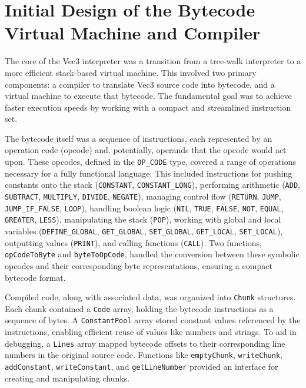 \section{Initial Design of the Bytecode Virtual Machine and Compiler}

The core of the Vec3 interpreter was a transition from a tree-walk interpreter to a more efficient stack-based virtual machine. This involved two primary components: a compiler to translate Vec3 source code into bytecode, and a virtual machine to execute that bytecode. The fundamental goal was to achieve faster execution speeds by working with a compact and streamlined instruction set.

The bytecode itself was a sequence of instructions, each represented by an operation code (opcode) and, potentially, operands that the opcode would act upon. These opcodes, defined in the \texttt{OP\_CODE} type, covered a range of operations necessary for a fully functional language. This included instructions for pushing constants onto the stack (\texttt{CONSTANT}, \texttt{CONSTANT\_LONG}), performing arithmetic (\texttt{ADD}, \texttt{SUBTRACT}, \texttt{MULTIPLY}, \texttt{DIVIDE}, \texttt{NEGATE}), managing control flow (\texttt{RETURN}, \texttt{JUMP}, \texttt{JUMP\_IF\_FALSE}, \texttt{LOOP}), handling boolean logic (\texttt{NIL}, \texttt{TRUE}, \texttt{FALSE}, \texttt{NOT}, \texttt{EQUAL}, \texttt{GREATER}, \texttt{LESS}), manipulating the stack (\texttt{POP}), working with global and local variables (\texttt{DEFINE\_GLOBAL}, \texttt{GET\_GLOBAL}, \texttt{SET\_GLOBAL}, \texttt{GET\_LOCAL}, \texttt{SET\_LOCAL}), outputting values (\texttt{PRINT}), and calling functions (\texttt{CALL}). Two functions, \texttt{opCodeToByte} and \texttt{byteToOpCode}, handled the conversion between these symbolic opcodes and their corresponding byte representations, ensuring a compact bytecode format.

Compiled code, along with associated data, was organized into \texttt{Chunk} structures. Each chunk contained a \texttt{Code} array, holding the bytecode instructions as a sequence of bytes. A \texttt{ConstantPool} array stored constant values referenced by the instructions, enabling efficient reuse of values like numbers and strings. To aid in debugging, a \texttt{Lines} array mapped bytecode offsets to their corresponding line numbers in the original source code. Functions like \texttt{emptyChunk}, \texttt{writeChunk}, \texttt{addConstant}, \texttt{writeConstant}, and \texttt{getLineNumber} provided an interface for creating and manipulating chunks.

